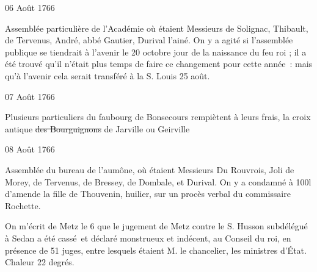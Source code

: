                      \begin{diary}{06 Août 1766}{}
                        
                         Assemblée particulière de l'Académie où
                           étaient Messieurs
                           de Solignac, Thibault, de
                              Tervenus,
                           André, abbé Gautier, Durival
                              l'ainé.
                           On y a agité si l'assemblée publique se tiendrait
                           à l'avenir le 20 octobre jour de la naissance du feu roi ; il a été trouvé qu'il
                           n'était plus
                           temps de faire ce changement pour cette
                           année : mais qu'à l'avenir cela serait
                           transféré à la S. Louis 25 août. \bigskip
        
        
                     \end{diary}

                     \begin{diary}{07 Août 1766}{}
                        
                         Plusieurs particuliers du faubourg de Bonsecours
                           rempiètent à leurs frais, la croix antique 
                           \sout{des Bourguignons} de Jarville ou Geirville
                        \bigskip
        
        
                     \end{diary}

                     \begin{diary}{08 Août 1766}{}
                        
                         Assemblée du bureau de l'aumône, où étaient
                           Messieurs
                           Du Rouvrois, Joli de Morey, de
                              Tervenus, de
                              Bressey, de
                              Dombale, et Durival. On
                           y a
                           condamné à 100l d'amende la
                              fille de Thouvenin,
                           huilier, sur un procès verbal du commissaire Rochette. \bigskip
        
        
                         On m'écrit de Metz
                           le 6 que le jugement
                           de Metz contre le S. Husson
                           subdélégué à Sedan a
                           été cassé et déclaré monstrueux et indécent,
                           au Conseil du roi, en
                           présence de 51 juges,
                           entre lesquels étaient M.
                              le chancelier, les
                           ministres d’État. Chaleur 22 degrés.
                        \bigskip
        
        
                     \end{diary}

